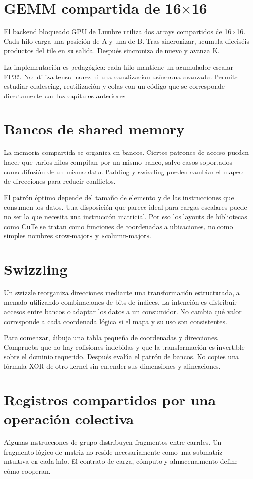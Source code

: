 \documentclass[12pt,a4paper,oneside]{report}
\begin{document}
\section{GEMM compartida de 16\ensuremath{\times}16}
El backend bloqueado GPU de Lumbre utiliza dos arrays compartidos de 16\ensuremath{\times}16. Cada hilo carga una posición de A y una de B. Tras sincronizar, acumula dieciséis productos del tile en su salida. Después sincroniza de nuevo y avanza K.

La implementación es pedagógica: cada hilo mantiene un acumulador escalar FP32. No utiliza tensor cores ni una canalización asíncrona avanzada. Permite estudiar coalescing, reutilización y colas con un código que se corresponde directamente con los capítulos anteriores.

\section{Bancos de shared memory}
La memoria compartida se organiza en bancos. Ciertos patrones de acceso pueden hacer que varios hilos compitan por un mismo banco, salvo casos soportados como difusión de un mismo dato. Padding y swizzling pueden cambiar el mapeo de direcciones para reducir conflictos.

El patrón óptimo depende del tamaño de elemento y de las instrucciones que consumen los datos. Una disposición que parece ideal para cargas escalares puede no ser la que necesita una instrucción matricial. Por eso los layouts de bibliotecas como CuTe se tratan como funciones de coordenadas a ubicaciones, no como simples nombres «row-major» y «column-major».

\section{Swizzling}
Un swizzle reorganiza direcciones mediante una transformación estructurada, a menudo utilizando combinaciones de bits de índices. La intención es distribuir accesos entre bancos o adaptar los datos a un consumidor. No cambia qué valor corresponde a cada coordenada lógica si el mapa y su uso son consistentes.

Para comenzar, dibuja una tabla pequeña de coordenadas y direcciones. Comprueba que no hay colisiones indebidas y que la transformación es invertible sobre el dominio requerido. Después evalúa el patrón de bancos. No copies una fórmula XOR de otro kernel sin entender sus dimensiones y alineaciones.

\section{Registros compartidos por una operación colectiva}
Algunas instrucciones de grupo distribuyen fragmentos entre carriles. Un fragmento lógico de matriz no reside necesariamente como una submatriz intuitiva en cada hilo. El contrato de carga, cómputo y almacenamiento define cómo cooperan.
\end{document}
